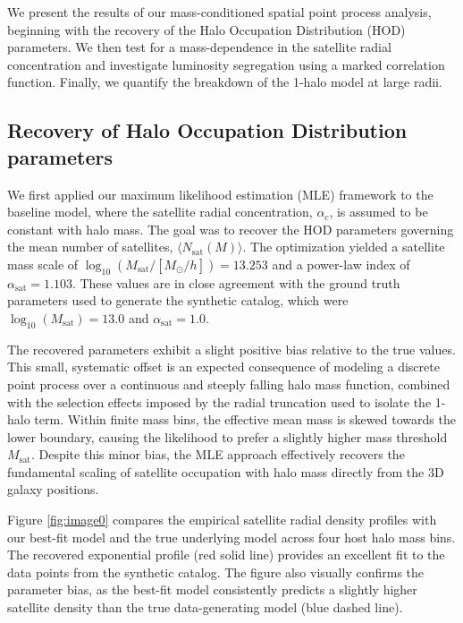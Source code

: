 \documentclass[]{article}
\begin{document}
We present the results of our mass-conditioned spatial point process analysis, beginning with the recovery of the Halo Occupation Distribution (HOD) parameters. We then test for a mass-dependence in the satellite radial concentration and investigate luminosity segregation using a marked correlation function. Finally, we quantify the breakdown of the 1-halo model at large radii.

\subsection{Recovery of Halo Occupation Distribution parameters}
We first applied our maximum likelihood estimation (MLE) framework to the baseline model, where the satellite radial concentration, $\alpha_c$, is assumed to be constant with halo mass. The goal was to recover the HOD parameters governing the mean number of satellites, $\langle N_{\text{sat}}(M) \rangle$. The optimization yielded a satellite mass scale of $\log_{10}(M_{\text{sat}}/[M_\odot/h]) = 13.253$ and a power-law index of $\alpha_{\text{sat}} = 1.103$. These values are in close agreement with the ground truth parameters used to generate the synthetic catalog, which were $\log_{10}(M_{\text{sat}}) = 13.0$ and $\alpha_{\text{sat}} = 1.0$.

The recovered parameters exhibit a slight positive bias relative to the true values. This small, systematic offset is an expected consequence of modeling a discrete point process over a continuous and steeply falling halo mass function, combined with the selection effects imposed by the radial truncation used to isolate the 1-halo term. Within finite mass bins, the effective mean mass is skewed towards the lower boundary, causing the likelihood to prefer a slightly higher mass threshold $M_{\text{sat}}$. Despite this minor bias, the MLE approach effectively recovers the fundamental scaling of satellite occupation with halo mass directly from the 3D galaxy positions.

Figure \ref{fig:image0} compares the empirical satellite radial density profiles with our best-fit model and the true underlying model across four host halo mass bins. The recovered exponential profile (red solid line) provides an excellent fit to the data points from the synthetic catalog. The figure also visually confirms the parameter bias, as the best-fit model consistently predicts a slightly higher satellite density than the true data-generating model (blue dashed line).
\end{document}
